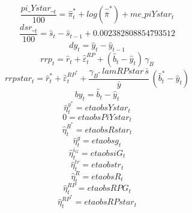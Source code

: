 \begin{dmath}
\frac{{pi\_Ystar\__{t}}}{100}={\hat{\pi}^*_{t}}+log\left({\hat{\bar{\pi}}^*}\right)+{me\_piYstar_{t}}
\end{dmath}
\begin{dmath}
\frac{{dsr\__{t}}}{100}={\hat{s}_{t}}-{\hat{s}_{t-1}}+0.002382808854793512
\end{dmath}
\begin{dmath}
{dy_{t}}={\hat{y}_{t}}-{\hat{y}_{t-1}}
\end{dmath}
\begin{dmath}
{rrp_{t}}={\hat{r}_{t}}+{\hat{\varepsilon}^{RP}_{t}}+\left({\hat{b}_{t}}-{\hat{y}_{t}}\right)\, {\gamma_{B}}
\end{dmath}
\begin{dmath}
{rrpstar_{t}}={\hat{r}^*_{t}}+{\hat{\varepsilon}^{RP^*}_{t}}+\frac{{\gamma_{B^*}}\, {lamRPstar}\, {\bar{s}}}{{\bar{y}}}\, \left({\hat{b}^*_{t}}-{\hat{y}_{t}}\right)
\end{dmath}
\begin{dmath}
{{by}_{t}}={\hat{b}_{t}}-{\hat{y}_{t}}
\end{dmath}
\begin{dmath}
{\hat{\eta}^{y^*}_{t}}={etaobsYstar_{t}}
\end{dmath}
\begin{dmath}
0={etaobsPiYstar_{t}}
\end{dmath}
\begin{dmath}
{\hat{\eta}^{R^*}_{t}}={etaobsRstar_{t}}
\end{dmath}
\begin{dmath}
{\hat{\eta}^{g}_{t}}={etaobsg_{t}}
\end{dmath}
\begin{dmath}
{\hat{\eta}^{i_G}_{t}}={etaobsiG_{t}}
\end{dmath}
\begin{dmath}
{\hat{\eta}^{tr}_{t}}={etaobstr_{t}}
\end{dmath}
\begin{dmath}
{\hat{\eta}^{R}_{t}}={etaobsR_{t}}
\end{dmath}
\begin{dmath}
{\hat{\eta}^{RP}_{t}}={etaobsRPG_{t}}
\end{dmath}
\begin{dmath}
{\hat{\eta}^{RP^*}_{t}}={etaobsRPstar_{t}}
\end{dmath}
